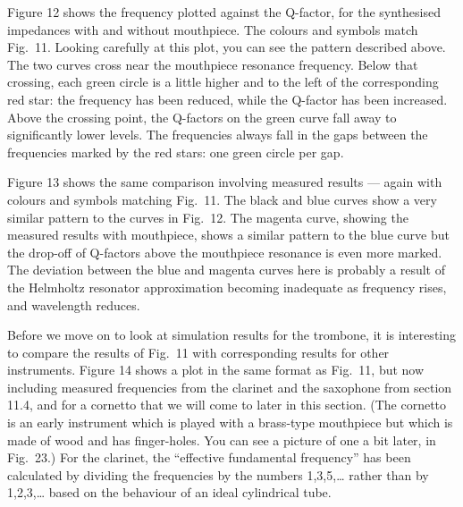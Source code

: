   Figure 12 shows the frequency plotted against the Q-factor, for the 
  synthesised impedances with and without mouthpiece. The colours and symbols 
  match Fig.\ 11. Looking carefully at this plot, you can see the pattern 
  described above. The two curves cross near the mouthpiece resonance 
  frequency. Below that crossing, each green circle is a little higher and to 
  the left of the corresponding red star: the frequency has been reduced, while 
  the Q-factor has been increased. Above the crossing point, the Q-factors on 
  the green curve fall away to significantly lower levels. The frequencies 
  always fall in the gaps between the frequencies marked by the red stars: one 
  green circle per gap. 


  Figure 13 shows the same comparison involving measured results — again with 
  colours and symbols matching Fig.\ 11. The black and blue curves show a very 
  similar pattern to the curves in Fig.\ 12. The magenta curve, showing the 
  measured results with mouthpiece, shows a similar pattern to the blue curve 
  but the drop-off of Q-factors above the mouthpiece resonance is even more 
  marked. The deviation between the blue and magenta curves here is probably a 
  result of the Helmholtz resonator approximation becoming inadequate as 
  frequency rises, and wavelength reduces. 


  Before we move on to look at simulation results for the trombone, it is 
  interesting to compare the results of Fig.\ 11 with corresponding results for 
  other instruments. Figure 14 shows a plot in the same format as Fig.\ 11, but 
  now including measured frequencies from the clarinet and the saxophone from 
  section 11.4, and for a cornetto that we will come to later in this section. 
  (The cornetto is an early instrument which is played with a brass-type 
  mouthpiece but which is made of wood and has finger-holes. You can see a 
  picture of one a bit later, in Fig.\ 23.) For the clarinet, the “effective 
  fundamental frequency” has been calculated by dividing the frequencies by the 
  numbers 1,3,5,… rather than by 1,2,3,… based on the behaviour of an ideal 
  cylindrical tube. 

